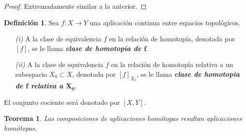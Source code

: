 \documentclass[11pt]{report}
\newtheorem{theorem}{Teorema}[chapter]
\theoremstyle{definition}
\newtheorem{definition}{Definición}[chapter]
\theoremstyle{definition}
\theoremstyle{remark}
\begin{document}
\begin{proof}
    Extremadamente similar a la anterior.
\end{proof}

\begin{definition}
    Sea $f \colon X \to Y$ una aplicación continua entre espacios topológicos. 
    \begin{itemize}
        \item[\textit{(i)}] A la clase de equivalencia $f$ en la relación de homotopía, denotada por $[f]$, se le llama \textbf{\textit{clase de homotopía de $\bm{f}$}}.
        \item[\textit{(ii)}] A la clase de equivalencia $f$ en la relación de homotopía relativa a un subespacio $X_0 \subset X$, denotada por $[f]_{X_0}$, se le llama \textbf{\textit{clase de homotopía de $\bm{f}$ relativa a $\bm{X_0}$}}.
    \end{itemize}
    El conjunto cociente será denotado por $[X,Y]$.
\end{definition}

\begin{theorem}
\label{teo1.3.}
    Las composiciones de aplicaciones homótopas resultan aplicaciones homótopas.
\end{theorem}
\end{document}
